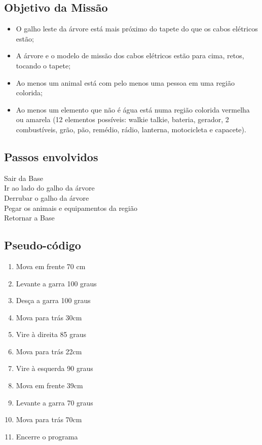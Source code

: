 \documentclass{article}
\begin{document}
	\subsection{Objetivo da Missão}
		\begin{itemize}
			\item O galho leste da árvore está mais próximo do tapete do que os 
			cabos elétricos estão;
			\item A árvore e o modelo de missão dos cabos elétricos estão para 
			cima, retos, tocando o tapete;
			\item Ao menos um animal está com pelo menos uma pessoa em uma 
			região colorida;
			\item Ao menos um elemento que não é água está numa região colorida 
			vermelha ou amarela (12 elementos possíveis: walkie talkie, bateria, 
			gerador, 2 combustíveis, grão, pão, remédio, rádio, lanterna, 
			motocicleta e capacete).
		\end{itemize}

	\subsection{Passos envolvidos}
		Sair da Base\\
    	Ir ao lado do galho da árvore\\
    	Derrubar o galho da árvore\\
    	Pegar os animais e equipamentos da região\\
   		Retornar a Base\\

   	\subsection{Pseudo-código}
   		\begin{enumerate}
	   		\item Mova em frente 70 cm
	   		\item Levante a garra 100 graus
	   		\item Desça a garra 100 graus
	   		\item Mova para trás 30cm
	   		\item Vire à direita 85 graus
	   		\item Mova para trás 22cm
	   		\item Vire à esquerda 90 graus
	   		\item Mova em frente 39cm
	   		\item Levante a garra 70 graus
	   		\item Mova para trás 70cm
		    \item Encerre o programa
		\end{enumerate}
\end{document}
